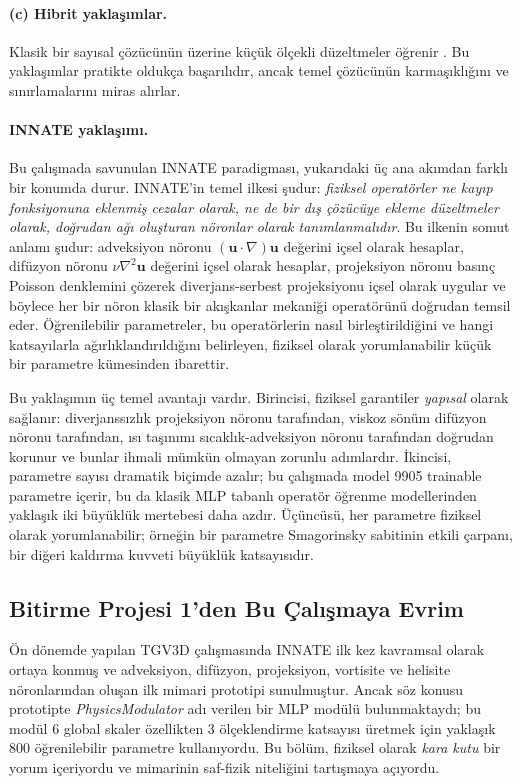 \paragraph{(c) Hibrit yaklaşımlar.} Klasik bir sayısal çözücünün üzerine küçük ölçekli düzeltmeler öğrenir \cite{kochkov_ml_cfd_2021, lesnets_2024}. Bu yaklaşımlar pratikte oldukça başarılıdır, ancak temel çözücünün karmaşıklığını ve sınırlamalarını miras alırlar.

\paragraph{INNATE yaklaşımı.} Bu çalışmada savunulan INNATE paradigması, yukarıdaki üç ana akımdan farklı bir konumda durur. INNATE'in temel ilkesi şudur: \emph{fiziksel operatörler ne kayıp fonksiyonuna eklenmiş cezalar olarak, ne de bir dış çözücüye ekleme düzeltmeler olarak, doğrudan ağı oluşturan nöronlar olarak tanımlanmalıdır}. Bu ilkenin somut anlamı şudur: adveksiyon nöronu $(\mathbf{u}\cdot\nabla)\mathbf{u}$ değerini içsel olarak hesaplar, difüzyon nöronu $\nu\nabla^{2}\mathbf{u}$ değerini içsel olarak hesaplar, projeksiyon nöronu basınç Poisson denklemini çözerek diverjans-serbest projeksiyonu içsel olarak uygular ve böylece her bir nöron klasik bir akışkanlar mekaniği operatörünü doğrudan temsil eder. Öğrenilebilir parametreler, bu operatörlerin nasıl birleştirildiğini ve hangi katsayılarla ağırlıklandırıldığını belirleyen, fiziksel olarak yorumlanabilir küçük bir parametre kümesinden ibarettir.

Bu yaklaşımın üç temel avantajı vardır. Birincisi, fiziksel garantiler \emph{yapısal} olarak sağlanır: diverjanssızlık projeksiyon nöronu tarafından, viskoz sönüm difüzyon nöronu tarafından, ısı taşınımı sıcaklık-adveksiyon nöronu tarafından doğrudan korunur ve bunlar ihmali mümkün olmayan zorunlu adımlardır. İkincisi, parametre sayısı dramatik biçimde azalır; bu çalışmada model 9905 trainable parametre içerir, bu da klasik MLP tabanlı operatör öğrenme modellerinden yaklaşık iki büyüklük mertebesi daha azdır. Üçüncüsü, her parametre fiziksel olarak yorumlanabilir; örneğin bir parametre Smagorinsky sabitinin etkili çarpanı, bir diğeri kaldırma kuvveti büyüklük katsayısıdır.

\subsection{Bitirme Projesi 1'den Bu Çalışmaya Evrim}

Ön dönemde yapılan TGV3D çalışmasında \cite{tezgocen_bitirme1_2026} INNATE ilk kez kavramsal olarak ortaya konmuş ve adveksiyon, difüzyon, projeksiyon, vortisite ve helisite nöronlarından oluşan ilk mimari prototipi sunulmuştur. Ancak söz konusu prototipte \emph{PhysicsModulator} adı verilen bir MLP modülü bulunmaktaydı; bu modül 6 global skaler özellikten 3 ölçeklendirme katsayısı üretmek için yaklaşık 800 öğrenilebilir parametre kullanıyordu. Bu bölüm, fiziksel olarak \emph{kara kutu} bir yorum içeriyordu ve mimarinin saf-fizik niteliğini tartışmaya açıyordu.

